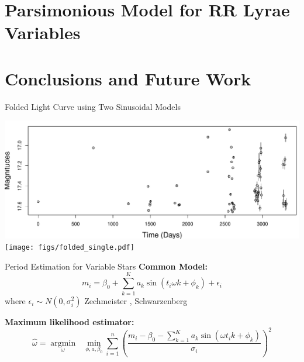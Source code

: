\documentclass[12pt]{beamer}
\newcommand{\argmin}[1]{\underset{#1}{\operatorname{argmin}}\text{ }}
\begin{document}


\section{Parsimonious Model for RR Lyrae Variables}

\section{Conclusions and Future Work}

\begin{frame}{Folded Light Curve using Two Sinusoidal Models}
\begin{center}
\includegraphics[scale=0.32]{figs/unfolded_single.pdf}\\
\texttt{[image: figs/folded\_single.pdf]}
\end{center}
\end{frame}

\begin{frame}{Period Estimation for Variable Stars}
\textbf{Common Model:} 
\begin{equation*}
m_i = \beta_0 + \sum_{k=1}^K a_k \sin(t_i\omega k + \phi_k) + \epsilon_i
\end{equation*}
where $\epsilon_i \sim N(0,\sigma_i^2)$ {\tiny Zechmeister \cite{zechmeister2009generalised}, Schwarzenberg \cite{schwarzenberg1996fast}}

\vspace{.2in}

\textbf{Maximum likelihood estimator:}
\begin{equation*}
\widehat{\omega} = \argmin{\omega} \min_{\phi,a,\beta_0} \sum_{i=1}^n\left(\frac{m_i - \beta_0 - \sum_{k=1}^K a_k\sin(\omega t_ik + \phi_k)}{\sigma_i}\right)^2
\end{equation*}
\end{frame}
\end{document}
